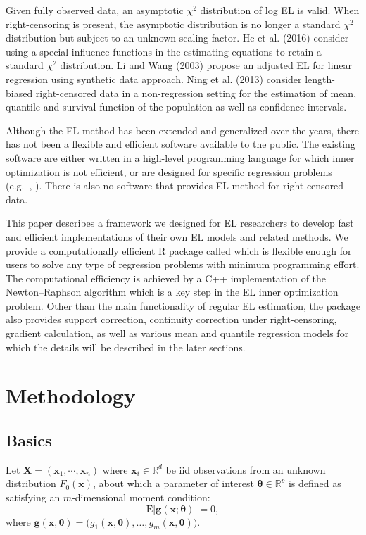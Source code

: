 \documentclass[article]{jss}
\renewcommand{\|}{\,|\,}
\begin{document}
Given fully observed data, an asymptotic \(\chi^2\) distribution of log EL is valid. When right-censoring is present, the asymptotic distribution is no longer a standard \(\chi^2\) distribution but subject to an unknown scaling factor. He et al. (2016) consider using a special influence functions in the estimating equations to retain a standard \(\chi^2\) distribution. Li and Wang (2003) propose an adjusted EL for linear regression using synthetic data approach. Ning et al. (2013) consider length-biased right-censored data in a non-regression setting for the estimation of mean, quantile and survival function of the population as well as confidence intervals.

Although the EL method has been extended and generalized over the years, there has not been a flexible and efficient software available to the public. The existing software are either written in a high-level programming language for which inner optimization is not efficient, or are designed for specific regression problems (e.g.~, ). There is also no software that provides EL method for right-censored data.

This paper describes a framework we designed for EL researchers to develop fast and efficient implementations of their own EL models and related methods. We provide a computationally efficient R package called  which is flexible enough for users to solve any type of regression problems with minimum programming effort. The computational efficiency is achieved by a C++ implementation of the Newton--Raphson algorithm which is a key step in the EL inner optimization problem. Other than the main functionality of regular EL estimation, the package also provides support correction, continuity correction under right-censoring, gradient calculation, as well as various mean and quantile regression models for which the details will be described in the later sections.

\hypertarget{methodology}{%
\section{Methodology}\label{methodology}}

\hypertarget{basics}{%
\subsection{Basics}\label{basics}}

Let \(\bm X= (\bm x_1,\cdots,\bm x_n)\) where \(\bm x_i\in\mathbb R^d\) be iid observations from an unknown distribution \(F_0(\bm x)\), about which a parameter of interest \(\bm \theta\in \mathbb R^p\) is defined as satisfying an \(m\)-dimensional moment condition:
\begin{equation} \label{eq:momcond}
  \textrm{E}\bigl[\bm g(\bm x;\bm \theta)\bigr] = 0,
\end{equation}
where \(\bm g(\bm x, \bm \theta) = \bigl( g_1(\bm x, \bm \theta), \ldots, g_m(\bm x, \bm \theta) \bigr)\).
\end{document}
